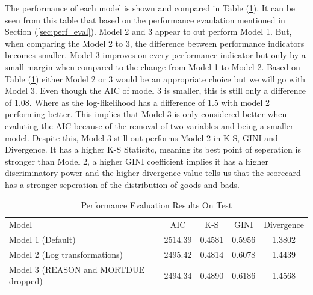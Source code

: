 The performance of each model is shown and compared in Table (\ref{perf_eval}). It can be seen from this table that based on the performance evaulation mentioned in Section (\ref{sec:perf_eval}). Model 2 and 3 appear to out perform Model 1. But, when comparing the Model 2 to 3, the difference between performance indicators becomes smaller. Model 3 improves on every performance indicator but only by a small margin when compared to the change from Model 1 to Model 2. Based on Table (\ref{perf_eval}) either Model 2 or 3 would be an appropriate choice but we will go with Model 3. Even though the AIC of model 3 is smaller, this is still only a difference of 1.08. Where as the log-likelihood has a difference of 1.5 with model 2 performing better. This implies that Model 3 is only considered better when evaluting the AIC because of the removal of two variables and being a smaller model. Despite this, Model 3 still out performs Model 2 in K-S, GINI and Divergence. It has a higher K-S Statisitc, meaning its best point of seperation is stronger than Model 2, a higher GINI coefficient implies it has a higher discriminatory power and the higher divergence value tells us that the scorecard has a stronger seperation of the distribution of goods and bads. \\

\begin{table}[H]
\begin{center}
\renewcommand{\arraystretch}{1.25}
\begin{tabular}{lcccc}
\toprule
Model & AIC & K-S & GINI & Divergence \\
Model 1 (Default) & 2514.39 & 0.4581 & 0.5956 & 1.3802  \\
Model 2 (Log transformations) & 2495.42 & 0.4814 & 0.6078 & 1.4439  \\
Model 3 (REASON and MORTDUE dropped) & 2494.34 & 0.4890 & 0.6186 & 1.4568 \\
\bottomrule
\end{tabular}
\caption{Performance Evaluation Results On Test \label{perf_eval}}
\end{center}
\end{table}

%

